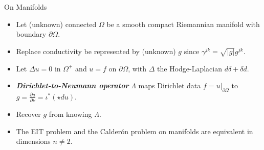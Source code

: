 \documentclass[aspectratio=169]{beamer}
\newcommand\boldgreen[1]{\textcolor{lighter_csu_green}{\emph{\textbf{#1}}}}
\begin{document}
\begin{frame}{On Manifolds}
\vfill 
    \begin{itemize}
        \pause
        \item Let (unknown) connected $\Omega$ be a smooth compact Riemannian manifold with boundary $\partial \Omega$.
        
        \pause
        \item Replace conductivity be represented by (unknown) $g$ since $\gamma^{jk}=\sqrt{|g|}g^{jk}$.
        
        \pause
        \item Let $\Delta u = 0$ in $\Omega^+$ and $u=f$ on $\partial \Omega$, with $\Delta$ the Hodge-Laplacian $d\delta+\delta d$.
        
        \pause
        \item \boldgreen{Dirichlet-to-Neumann operator} $\Lambda$ maps Dirichlet data $f=u|_{\partial \Omega}$ to $g = \frac{\partial u}{\partial \nu}=\iota^*(\star d u)$.
        
        \pause
        \item Recover $g$ from knowing $\Lambda$.
        
        \pause
        \item The EIT problem and the Calder\'on problem on manifolds are equivalent in dimensions $n\neq 2$.
    
    \end{itemize}
\vfill
\end{frame}
\end{document}
